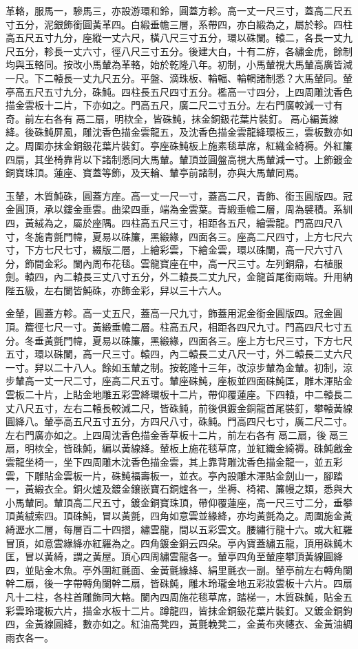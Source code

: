 \begin{pinyinscope}
革輅，服馬一，驂馬三，亦設游環和鈴，圓蓋方軫。高一丈一尺三寸，蓋高二尺五寸五分，泥銀飾銜圓黃革四。白緞垂幨三層，系帶四，亦白緞為之，屬於軫。四柱高五尺五寸九分，座縱一丈六尺，橫八尺三寸五分，環以硃闌。轅二，各長一丈九尺五分，軫長一丈六寸，徑八尺三寸五分。後建大白，十有二斿，各繡金虎，餘制均與玉輅同。按改小馬輦為革輅，始於乾隆八年。初制，小馬輦視大馬輦高廣皆減一尺。下二轅長一丈九尺五分。平盤、滴珠板、輪輻、輪輞諸制悉？大馬輦同。輦亭高五尺五寸九分，硃魨。四柱長五尺四寸五分。檻高一寸四分，上四周雕沈香色描金雲板十二片，下亦如之。門高五尺，廣二尺二寸五分。左右門廣較減一寸有奇。前左右各有鬲二扇，明栨全，皆硃魨，抹金銅鈒花葉片裝釘。鬲心編黃線絳。後硃魨屏風，雕沈香色描金雲龍五，及沈香色描金雲龍絳環板三，雲板數亦如之。周圍亦抹金銅鈒花葉片裝釘。亭座硃魨板上施素毯草席，紅織金綺褥。外紅簾四扇，其坐椅靠背以下諸制悉同大馬輦。輦頂並圓盤高視大馬輦減一寸。上飾鍍金銅寶珠頂。蓮座、寶蓋等飾，及天輪、輦亭前諸制，亦與大馬輦同焉。

玉輦，木質魨硃，圓蓋方座。高一丈一尺一寸，蓋高二尺，青飾、銜玉圓版四。冠金圓頂，承以鏤金垂雲。曲梁四垂，端為金雲葉。青緞垂幨二層，周為襞積。系紃四，黃絨為之，屬於座隅。四柱高五尺三寸，相距各五尺，繪雲龍。門高四尺八寸，冬施青氈門幃，夏易以硃簾，黑緞緣，四面各三。座高二尺四寸，上方七尺六寸，下方七尺七寸，綴版二層，上繪彩雲，下繪金雲，環以硃闌，高一尺六寸八分，飾間金彩。闌內周布花毯。雲龍寶座在中，高一尺三寸。左列銅鼎，右植服劍。轅四，內二轅長三丈八寸五分，外二轅長二丈九尺，金龍首尾銜兩端。升用納陛五級，左右闌皆魨硃，亦飾金彩，舁以三十六人。

金輦，圓蓋方軫。高一丈五尺，蓋高一尺九寸，飾蓋用泥金銜金圓版四。冠金圓頂。簷徑七尺一寸。黃緞垂幨二層。柱高五尺，相距各四尺九寸。門高四尺七寸五分。冬垂黃氈門幃，夏易以硃簾，黑緞緣，四面各三。座上方七尺三寸，下方七尺五寸，環以硃闌，高一尺三寸。轅四，內二轅長二丈八尺一寸，外二轅長二丈六尺一寸。舁以二十八人。餘如玉輦之制。按乾隆十三年，改涼步輦為金輦。初制，涼步輦高一丈一尺二寸，座高二尺五寸。輦座硃魨，座板並四面硃魨匡，雕木渾貼金雲板二十片，上貼金地雕五彩雲絳環板十二片，帶仰覆蓮座。下四轅，中二轅長二丈八尺五寸，左右二轅長較減二尺，皆硃魨，前後俱鍍金銅龍首尾裝釘，攀轅黃線圓絳八。輦亭高五尺五寸五分，方四尺八寸，硃魨。門高四尺七寸，廣二尺二寸。左右門廣亦如之。上四周沈香色描金香草板十二片，前左右各有鬲二扇，後鬲三扇，明栨全，皆硃魨，編以黃線絳。輦板上施花毯草席，並紅織金綺褥。硃魨戧金雲龍坐椅一，坐下四周雕木沈香色描金雲，其上靠背雕沈香色描金龍一，並五彩雲，下雕貼金雲板一片，硃魨福壽板一，並衣。亭內設雕木渾貼金劍山一，腳踏一，黃緞衣全。銅火爐及鍍金鑲嵌寶石銅爐各一，坐褥、椅裙、簾幔之類，悉與大小馬輦同。輦頂高二尺五寸，鍍金銅寶珠頂，帶仰覆蓮座，高一尺三寸二分，垂攀頂黃絨索四。頂硃魨，冒以黃氈，四角如意雲並緣絳，亦均黃氈為之。周圍施金黃綺瀝水二層，每層百二十四摺，繡雲龍，間以五彩雲文。腰繡行龍十六。或大紅羅冒頂，如意雲緣絳亦紅羅為之。四角鍍金銅云四朵。亭內寶蓋繡五龍，頂用硃魨木匡，冒以黃綺，謂之黃屋。頂心四周繡雲龍各一。輦亭四角至輦座攀頂黃線圓絳四，並貼金木魚。亭外圍紅氈面、金黃氈緣絳、絹里氈衣一副。輦亭前左右轉角闌幹二扇，後一字帶轉角闌幹二扇，皆硃魨，雕木玲瓏金地五彩妝雲板十六片。四扇凡十二柱，各柱首雕飾同大輅。闌內四周施花毯草席，踏梯一，木質硃魨，貼金五彩雲玲瓏板六片，描金水板十二片。蹲龍四，皆抹金銅鈒花葉片裝釘。又鍍金銅鉤四，金黃線圓絳，數亦如之。紅油高凳四，黃氈輓凳二，金黃布夾幰衣、金黃油綢雨衣各一。


\end{pinyinscope}
